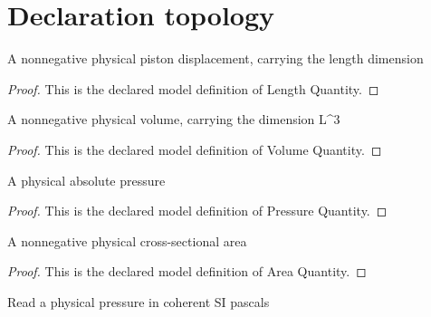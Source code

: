 \section{Declaration topology}
\begin{definition}
  \label{def:physics:phyx-mini-0448:phyxminiproblems-problemphyxmini0448-lengthquantity}
  A nonnegative physical piston displacement, carrying the length dimension
\end{definition}
\begin{proof}
  This is the declared model definition of Length Quantity.
\end{proof}
\begin{definition}
  \label{def:physics:phyx-mini-0448:phyxminiproblems-problemphyxmini0448-volumequantity}
  A nonnegative physical volume, carrying the dimension L\textasciicircum{}3
\end{definition}
\begin{proof}
  This is the declared model definition of Volume Quantity.
\end{proof}
\begin{definition}
  \label{def:physics:phyx-mini-0448:phyxminiproblems-problemphyxmini0448-pressurequantity}
  A physical absolute pressure
\end{definition}
\begin{proof}
  This is the declared model definition of Pressure Quantity.
\end{proof}
\begin{definition}
  \label{def:physics:phyx-mini-0448:phyxminiproblems-problemphyxmini0448-areaquantity}
  A nonnegative physical cross-sectional area
\end{definition}
\begin{proof}
  This is the declared model definition of Area Quantity.
\end{proof}
\begin{definition}
  \label{def:physics:phyx-mini-0448:phyxminiproblems-problemphyxmini0448-pressureinpascals}
  Read a physical pressure in coherent SI pascals
\end{definition}
